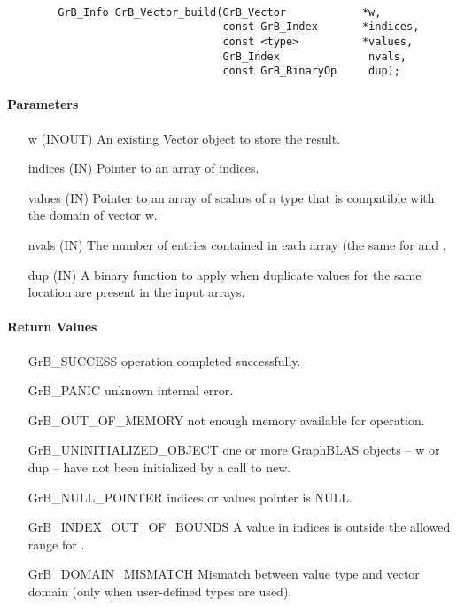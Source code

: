 \paragraph{\syntax}

\begin{verbatim}
        GrB_Info GrB_Vector_build(GrB_Vector            *w,
                                  const GrB_Index       *indices,
                                  const <type>          *values,
                                  GrB_Index              nvals,
                                  const GrB_BinaryOp     dup);
\end{verbatim}

\paragraph{Parameters}

\begin{itemize}[leftmargin=1.1in]
    \item[{\sf w}]       ({\sf INOUT}) An existing Vector object to store the result.
    \item[{\sf indices}] ({\sf IN}) Pointer to an array of indices. 
    \item[{\sf values}]  ({\sf IN}) Pointer to an array of scalars of a type that
                                     is compatible with the domain of vector {\sf w}.
    \item[{\sf nvals}]   ({\sf IN}) The number of entries contained in each array (the same for  and .
    \item[{\sf dup}]     ({\sf IN}) A binary function to apply when duplicate values for
                         the same location are present in the input arrays.
\end{itemize}

\paragraph{Return Values}

\begin{itemize}[leftmargin=2.1in]
\item[{\sf GrB\_SUCCESS}]     operation completed successfully.
\item[{\sf GrB\_PANIC}]       unknown internal error.
\item[{\sf GrB\_OUT\_OF\_MEMORY}]    not enough memory available for operation.
\item[{\sf GrB\_UNINITIALIZED\_OBJECT}]    one or more GraphBLAS objects -- {\sf w} or {\sf dup} -- 
                            have not been initialized by a call to {\sf new}.
\item[{\sf GrB\_NULL\_POINTER}]  {\sf indices} or {\sf values} pointer is {\sf NULL}.
\item[{\sf GrB\_INDEX\_OUT\_OF\_BOUNDS}]
                            A value in {\sf indices} is outside the allowed range for .
\item[\sf GrB\_DOMAIN\_MISMATCH]  
                       Mismatch between value type and vector domain
                       (only when user-defined types are used).
\end{itemize}

